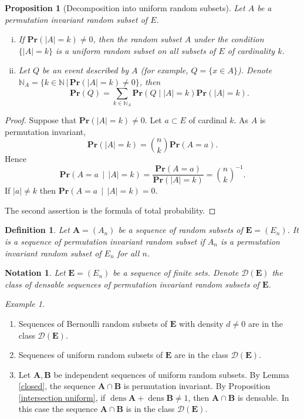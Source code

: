 \documentclass{article}
\DeclareMathOperator{\dens}{dens}
\newcommand{\moinsun}{^{-1}}
\newcommand{\bs}{\boldsymbol}
\def\Pr{\mathbf{Pr}}
\newtheorem{defi}[thm]{Definition}
\newtheorem{prop}[thm]{Proposition}
\newtheorem*{nota}{Notation}
\theoremstyle{remark}
\newtheorem{ex}[thm]{Example}
\begin{document}
\begin{prop} [Decomposition into uniform random subsets]\label{decomposition} Let $A$ be a permutation invariant random subset of $E$. 
\begin{enumerate} [(i)]
    \item If $\Pr(|A| = k)\neq 0$, then the random subset $A$ under the condition $\{|A| = k\}$ is a uniform random subset on all subsets of $E$ of cardinality $k$.
    \item Let $Q$ be an event described by $A$ (for example, $Q = \{x\in A\}$). Denote $\mathbb{N}_A = \{k\in \mathbb{N}\,|\,\Pr(|A|=k)\neq 0\}$, then
\[\Pr(Q) = \sum_{k\in \mathbb{N}_A}\Pr(Q\mid|A| = k)\Pr(|A|=k).\]
\end{enumerate}
\end{prop}
\begin{proof}
    Suppose that $\Pr(|A| = k)\neq 0$. Let $a\subset E$ of cardinal $k$. As $A$ is permutation invariant,
    \[\Pr(|A| = k) = \binom{n}{k}\Pr(A = a).\]
    Hence 
    \[\Pr\left(A = a\,\middle|\,|A| = k\right) = \frac{\Pr(A = a)}{\Pr(|A| = k)} = \binom{n}{k}\moinsun.\]
    If $|a|\neq k$ then $\Pr\left(A = a\,\middle|\,|A| = k\right) = 0$.
    
    The second assertion is the formula of total probability.
\end{proof}

\begin{defi} Let $\bs A = (A_n)$ be a sequence of random subsets of $\bs E = (E_n)$. It is a sequence of permutation invariant random subset if $A_n$ is a permutation invariant random subset of $E_n$ for all $n$. 
\end{defi}
\begin{nota} Let $\bs E = (E_n)$ be a sequence of finite sets. Denote $\mathcal{D}(\bs E)$ the class of densable sequences of permutation invariant random subsets of $\bs E$.
\end{nota}

\begin{ex}\quad
\begin{enumerate}
    \item Sequences of Bernoulli random subsets of $\bs E$ with density $d\neq 0 $ are in the class $\mathcal{D}(\bs E)$.
    \item Sequences of uniform random subsets of $\bs E$ are in the class $\mathcal{D}(\bs E)$. 
    \item Let $\bs A,\bs B$ be independent sequences of uniform random subsets. By Lemma \ref{closed}, the sequence $\bs A\cap \bs B$ is permutation invariant. By Proposition \ref{intersection uniform}, if $\dens\bs A + \dens\bs B\neq 1$, then $\bs A\cap \bs B$ is densable. In this case the sequence $\bs A\cap \bs B$ is in the class $\mathcal{D}(\bs E)$.
\end{enumerate}
\end{ex}
\end{document}
